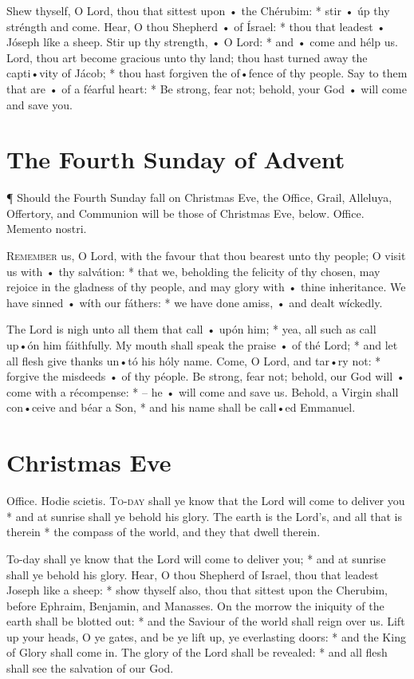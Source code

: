  Shew thyself, O Lord, thou that sittest upon • the Chérubim: * stir • úp thy stréngth and come.  \V Hear, O thou Shepherd • of Ísrael: * thou that leadest • Jóseph líke a sheep.   \V Stir up thy strength, • O Lord: * and • come and hélp us.  Lord, thou art become gracious unto thy land; thou hast turned away the capti•vity of Jácob; * thou hast forgiven the of•fence of thy people.   Say to them that are • of a féarful heart: * Be strong, fear not; behold, your God • will come and save you.


\section{The Fourth Sunday of Advent}
¶ Should the Fourth Sunday fall on {Christmas Eve}, the {Office, Grail, Alleluya, Offertory,} and {Communion} will be those of {Christmas Eve}, below.
Office. Memento nostri.

\lettrine{R}{emember} us, O Lord, with the favour that thou bearest unto thy people; O visit us with • thy salvátion: * that we, beholding the felicity of thy chosen, may rejoice in the gladness of thy people, and may glory with • thine inheritance.  We have sinned • wíth our fáthers: * we have done amiss, • and dealt wíckedly.

 The Lord is nigh unto all them that call • upón him; * yea, all such as call up•ón him fáithfully. \V My mouth shall speak the praise • of thé Lord; * and let all flesh give thanks un•tó his hóly name.  \V Come, O Lord, and tar•ry not: * forgive the misdeeds • of thy péople.  Be strong, fear not; behold, our God will • come with a récompense: * – he • will come and save us.  Behold, a Virgin shall con•ceive and béar a Son, * and his name shall be call•ed Emmanuel.


\section{Christmas Eve}
Office. Hodie scietis.
\lettrine{T}{o-day} shall ye know that the Lord will come to deliver you * and at sunrise shall ye behold his glory.  The earth is the Lord’s, and all that is therein * the compass of the world, and they that dwell therein.

 To-day shall ye know that the Lord will come to deliver you; * and at sunrise shall ye behold his glory. \V Hear, O thou Shepherd of Israel, thou that leadest Joseph like a sheep: * show thyself also, thou that sittest upon the Cherubim, before Ephraim, Benjamin, and Manasses.  \V On the morrow the iniquity of the earth shall be blotted out: * and the Saviour of the world shall reign over us.  Lift up your heads, O ye gates, and be ye lift up, ye everlasting doors: * and the King of Glory shall come in.  The glory of the Lord shall be revealed: * and all flesh shall see the salvation of our God.

